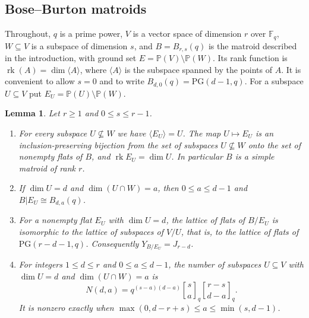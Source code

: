 \documentclass{amsart}
\newtheorem{lemma}[theorem]{Lemma}
\theoremstyle{remark}
\numberwithin{equation}{section}
\newcommand{\qbinom}[3]{\genfrac{[}{]}{0pt}{}{#1}{#2}_{#3}}
\newcommand{\F}{\mathbb{F}}
\newcommand{\PP}{\mathbb{P}}
\newcommand{\PG}{\mathrm{PG}}
\newcommand{\rk}{\operatorname{rk}}
\begin{document}
\subsection{Bose--Burton matroids}
Throughout, $q$ is a prime power, $V$ is a vector space of dimension $r$ over $\F_q$, $W\subseteq V$ is a subspace of dimension $s$, and $B=B_{r,s}(q)$ is the matroid described in the introduction, with ground set $E=\PP(V)\setminus\PP(W)$. Its rank function is $\rk(A)=\dim\langle A\rangle$, where $\langle A\rangle$ is the subspace spanned by the points of $A$. It is convenient to allow $s=0$ and to write $B_{d,0}(q)=\PG(d-1,q)$. For a subspace $U\subseteq V$ put $E_U=\PP(U)\setminus\PP(W)$.

\begin{lemma}\label{lem:flats}
Let $r\ge1$ and $0\le s\le r-1$.
\begin{enumerate}
\item[(a)] For every subspace $U\not\subseteq W$ we have $\langle E_U\rangle=U$. The map $U\mapsto E_U$ is an inclusion-preserving bijection from the set of subspaces $U\not\subseteq W$ onto the set of nonempty flats of $B$, and $\rk E_U=\dim U$. In particular $B$ is a simple matroid of rank $r$.
\item[(b)] If $\dim U=d$ and $\dim(U\cap W)=a$, then $0\le a\le d-1$ and $B|E_U\cong B_{d,a}(q)$.
\item[(c)] For a nonempty flat $E_U$ with $\dim U=d$, the lattice of flats of $B/E_U$ is isomorphic to the lattice of subspaces of $V/U$, that is, to the lattice of flats of $\PG(r-d-1,q)$. Consequently $Y_{B/E_U}=J_{r-d}$.
\item[(d)] For integers $1\le d\le r$ and $0\le a\le d-1$, the number of subspaces $U\subseteq V$ with $\dim U=d$ and $\dim(U\cap W)=a$ is
\begin{equation}\label{eq:N}
  N(d,a)=q^{(s-a)(d-a)}\qbinom{s}{a}{q}\qbinom{r-s}{d-a}{q}.
\end{equation}
It is nonzero exactly when $\max(0,d-r+s)\le a\le\min(s,d-1)$.
\end{enumerate}
\end{lemma}
\end{document}
